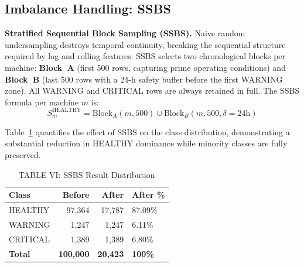 \documentclass[conference]{IEEEtran}
\begin{document}
\subsection{Imbalance Handling: SSBS}
\textbf{Stratified Sequential Block Sampling (SSBS).}
Naive random undersampling destroys temporal continuity, breaking the
sequential structure required by lag and rolling features. SSBS selects two
chronological blocks per machine: \textbf{Block~A} (first 500 rows, capturing
prime operating conditions) and \textbf{Block~B} (last 500 rows with a 24-h
safety buffer before the first WARNING zone). All WARNING and CRITICAL rows
are always retained in full. The SSBS formula per machine $m$ is:
\begin{equation}
S_m^{\text{HEALTHY}} = \text{Block}_A(m,500) \cup \text{Block}_B(m,500,\delta=24\text{h})
\label{eq:ssbs}
\end{equation}


Table~\ref{tab:ssbs} quantifies the effect of SSBS on the class distribution, demonstrating a substantial reduction in HEALTHY dominance while minority classes are fully preserved.

\begin{table}[htbp]
\caption{TABLE VI: SSBS Result Distribution}
\centering
\begin{tabular}{lrrl}
\hline
\textbf{Class} & \textbf{Before} & \textbf{After} & \textbf{After \%} \\
\hline
HEALTHY  & 97,364 & 17,787 & 87.09\% \\
WARNING  &  1,247 &  1,247 &  6.11\% \\
CRITICAL &  1,389 &  1,389 &  6.80\% \\
\hline
\textbf{Total} & \textbf{100,000} & \textbf{20,423} & \textbf{100\%} \\
\hline
\end{tabular}
\label{tab:ssbs}
\end{table}
\end{document}
